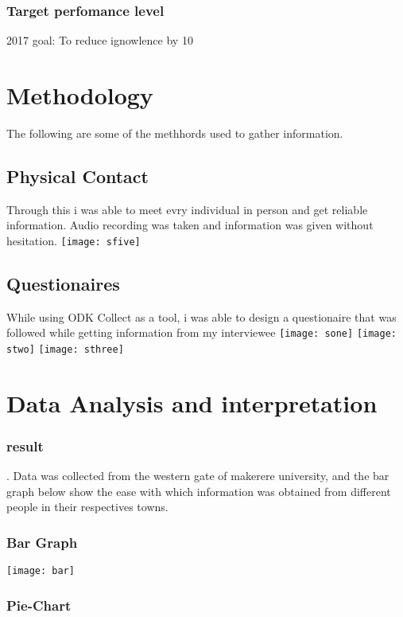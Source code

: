 \documentclass{article}
\begin{document}
\subsubsection{Target perfomance level}
2017 goal: To reduce ignowlence by 10%

\section{Methodology}
The following are some of the methhords used to gather information.
\subsection{Physical Contact}
Through this i was able to meet evry individual in person and get reliable information. Audio recording was taken and information was given without hesitation.
\texttt{[image: sfive]} 

\subsection{Questionaires}
While using ODK Collect as a tool, i was able to design a questionaire that was followed while getting information from my interviewee
\texttt{[image: sone]} 
\texttt{[image: stwo]} 
\texttt{[image: sthree]} 

\section{Data Analysis and interpretation}

\subsubsection{result}.
Data was collected from the western gate of makerere university, and the bar graph below show the ease with which information was obtained from different people in their respectives towns.
\subsubsection{Bar Graph}

\texttt{[image: bar]} 

\subsubsection{Pie-Chart}
\end{document}
